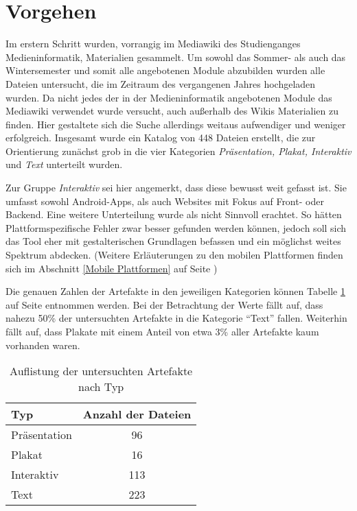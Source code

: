
\section{Vorgehen}
Im erstern Schritt wurden, vorrangig im Mediawiki des Studienganges Medieninformatik, Materialien gesammelt. Um sowohl das Sommer- als auch das Wintersemester und somit alle angebotenen Module abzubilden wurden alle Dateien untersucht, die im Zeitraum des vergangenen Jahres hochgeladen wurden.
Da nicht jedes der in der Medieninformatik angebotenen Module das Mediawiki verwendet wurde versucht, auch außerhalb des Wikis Materialien zu finden. Hier gestaltete sich die Suche allerdings weitaus aufwendiger und weniger erfolgreich.
Insgesamt wurde ein Katalog von 448 Dateien erstellt, die zur Orientierung zunächst grob in die vier Kategorien \textit{Präsentation, Plakat, Interaktiv} und \textit{Text} unterteilt wurden.

Zur Gruppe \textit{Interaktiv} sei hier angemerkt, dass diese bewusst weit gefasst ist. Sie umfasst sowohl Android-Apps, als auch Websites mit Fokus auf Front- oder Backend.
Eine weitere Unterteilung wurde als nicht Sinnvoll erachtet. So hätten Plattformspezifische Fehler zwar besser gefunden werden können, jedoch soll sich das Tool eher mit gestalterischen Grundlagen befassen und ein möglichst weites Spektrum abdecken. (Weitere Erläuterungen zu den mobilen Plattformen finden sich im Abschnitt \ref{Mobile Plattformen} auf Seite \pageref{Mobile Plattformen})

Die genauen Zahlen der Artefakte in den jeweiligen Kategorien können Tabelle \ref{table:types} auf Seite \pageref{table:types} entnommen werden. Bei der Betrachtung der Werte fällt auf, dass nahezu 50\% der untersuchten Artefakte in die Kategorie “Text” fallen. Weiterhin fällt auf, dass Plakate mit einem Anteil von etwa 3\% aller Artefakte kaum vorhanden waren.

\begin{table}[]
\centering
\begin{tabular}{|l|c|}
\hline
\textbf{Typ} & \multicolumn{1}{l|}{\textbf{Anzahl der Dateien}} \\ \hline
Präsentation & 96                                               \\ \hline
Plakat       & 16                                               \\ \hline
Interaktiv   & 113                                              \\ \hline
Text         & 223                                              \\ \hline
\end{tabular}
\caption{Auflistung der untersuchten Artefakte nach Typ}
\label{table:types}
\end{table}

